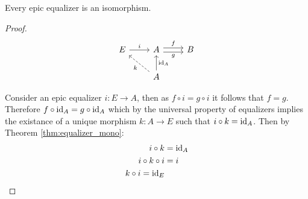 \begin{theorem}
  Every epic equalizer is an isomorphism.

  \begin{proof}
    \[\begin{tikzcd}[ampersand replacement=\&]
      E \& A \& B \\
      \& A
      \arrow["f", shift left=1, from=1-2, to=1-3]
      \arrow["g"', shift right=1, from=1-2, to=1-3]
      \arrow["{\id_A}"', from=2-2, to=1-2]
      \arrow["k", dashed, from=2-2, to=1-1]
      \arrow["i", from=1-1, to=1-2]
    \end{tikzcd}\]

    Consider an epic equalizer $i:E\to A$, then as $f\circ i = g\circ i$ it
    follows that $f= g$. Therefore $f\circ \mathrm{id}_A = g \circ \mathrm{id}_A$ which by the
    universal property of equalizers implies the existance of a unique morphism
    $k:A\to E$ such that $i\circ k = \mathrm{id}_A$. Then by Theorem
    \ref{thm:equalizer_mono}:
    \[
      \begin{aligned}
        i\circ k &= \mathrm{id}_A\\
        i\circ k \circ i &= i\\
        k\circ i = \mathrm{id}_E
      \end{aligned}
    \]
  \end{proof}
\end{theorem}
